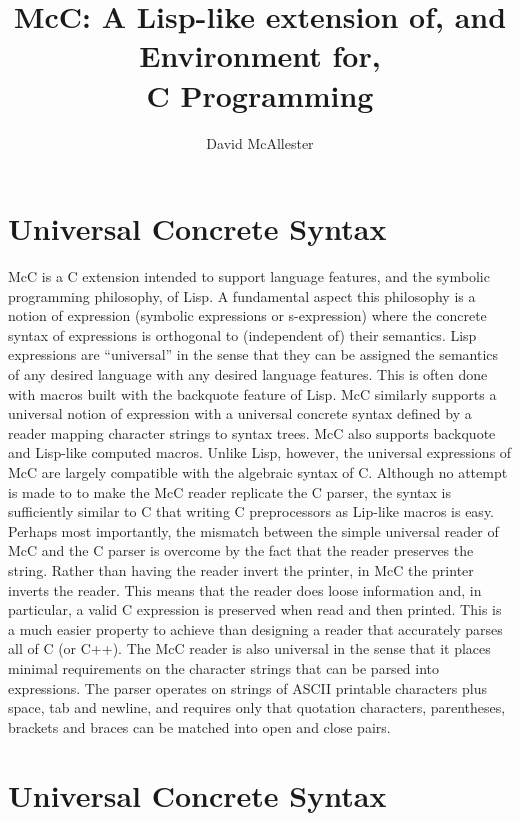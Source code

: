 \documentclass{article}
\title{McC: A Lisp-like extension of, and Environment for,  \\C Programming}
\author{David McAllester}
\begin{document}
\maketitle

\section{Universal Concrete Syntax}

\bigskip
\bigskip

McC is a C extension intended to support language features, and the symbolic programming philosophy, of Lisp.  A fundamental
aspect this philosophy is a notion of expression (symbolic expressions or s-expression) where the concrete syntax of expressions is orthogonal to
(independent of) their semantics.  Lisp expressions are ``universal'' in the sense that they can be assigned the semantics of any desired language
with any desired language features.  This is often done with macros built with the backquote feature of Lisp.  McC similarly supports a universal notion
of expression with a universal concrete syntax defined by a reader mapping character strings to syntax trees.  McC also supports backquote and
Lisp-like computed macros.  Unlike Lisp, however, the universal expressions of McC are largely compatible with the algebraic syntax of C.  Although no attempt is made to
to make the McC reader replicate the C parser, the syntax is sufficiently similar to C that writing C preprocessors as Lip-like macros is easy.
Perhaps most importantly, the mismatch between the simple universal reader of McC and the C parser is overcome by the fact that the reader preserves
the string.  Rather than having the reader invert the printer, in McC the printer inverts the reader.  This means that the reader does loose
information and, in particular, a valid C expression is preserved when read and then printed.  This is a much easier property to achieve than
designing a reader that accurately parses all of C (or C++).
The McC reader is also universal
in the sense that it places minimal
requirements on the character strings that can be parsed into expressions. The parser operates on strings of ASCII printable characters plus space, tab and newline,
and requires only that quotation characters, parentheses, brackets and braces can be matched into open and close pairs.

\section{Universal Concrete Syntax}
\end{document}
